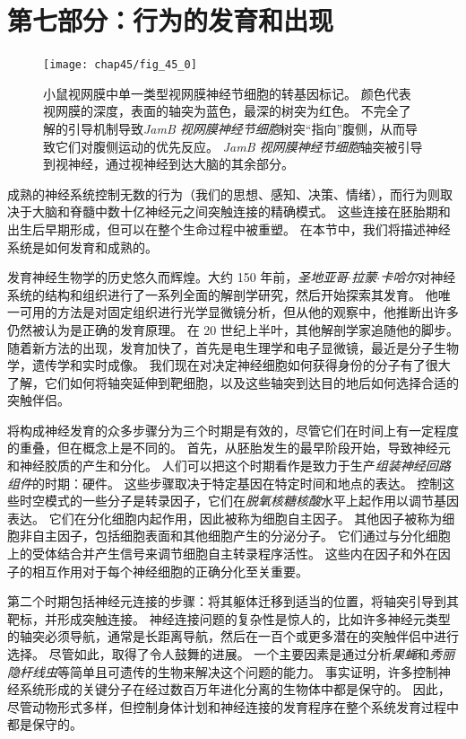 \chapter*{第七部分：行为的发育和出现}

\begin{figure}[htbp]
	\centering
	\texttt{[image: chap45/fig\_45\_0]}
	\caption{小鼠视网膜中单一类型视网膜神经节细胞的转基因标记。
		颜色代表视网膜的深度，表面的轴突为蓝色，最深的树突为红色。
		不完全了解的引导机制导致\textit{JamB 视网膜神经节细胞}树突“指向”腹侧，从而导致它们对腹侧运动的优先反应。
		\textit{JamB 视网膜神经节细胞}轴突被引导到视神经，通过视神经到达大脑的其余部分。}
	\label{fig:45_0}
\end{figure}


成熟的神经系统控制无数的行为（我们的思想、感知、决策、情绪），而行为则取决于大脑和脊髓中数十亿神经元之间突触连接的精确模式。
这些连接在胚胎期和出生后早期形成，但可以在整个生命过程中被重塑。
在本节中，我们将描述神经系统是如何发育和成熟的。


发育神经生物学的历史悠久而辉煌。大约 150 年前，\textit{圣地亚哥$\cdot$拉蒙$\cdot$卡哈尔}对神经系统的结构和组织进行了一系列全面的解剖学研究，然后开始探索其发育。
他唯一可用的方法是对固定组织进行光学显微镜分析，但从他的观察中，他推断出许多仍然被认为是正确的发育原理。
在 20 世纪上半叶，其他解剖学家追随他的脚步。
随着新方法的出现，发育加快了，首先是电生理学和电子显微镜，最近是分子生物学，遗传学和实时成像。
我们现在对决定神经细胞如何获得身份的分子有了很大了解，它们如何将轴突延伸到靶细胞，以及这些轴突到达目的地后如何选择合适的突触伴侣。


将构成神经发育的众多步骤分为三个时期是有效的，尽管它们在时间上有一定程度的重叠，但在概念上是不同的。
首先，从胚胎发生的最早阶段开始，导致神经元和神经胶质的产生和分化。
人们可以把这个时期看作是致力于生产\textit{组装神经回路组件}的时期：硬件。
这些步骤取决于特定基因在特定时间和地点的表达。
控制这些时空模式的一些分子是转录因子，它们在\textit{脱氧核糖核酸}水平上起作用以调节基因表达。
它们在分化细胞内起作用，因此被称为细胞自主因子。
其他因子被称为细胞非自主因子，包括细胞表面和其他细胞产生的分泌分子。
它们通过与分化细胞上的受体结合并产生信号来调节细胞自主转录程序活性。
这些内在因子和外在因子的相互作用对于每个神经细胞的正确分化至关重要。


第二个时期包括神经元连接的步骤：将其躯体迁移到适当的位置，将轴突引导到其靶标，并形成突触连接。
神经连接问题的复杂性是惊人的，比如许多神经元类型的轴突必须导航，通常是长距离导航，然后在一百个或更多潜在的突触伴侣中进行选择。
尽管如此，取得了令人鼓舞的进展。
一个主要因素是通过分析\textit{果蝇}和\textit{秀丽隐杆线虫}等简单且可遗传的生物来解决这个问题的能力。
事实证明，许多控制神经系统形成的关键分子在经过数百万年进化分离的生物体中都是保守的。
因此，尽管动物形式多样，但控制身体计划和神经连接的发育程序在整个系统发育过程中都是保守的。


